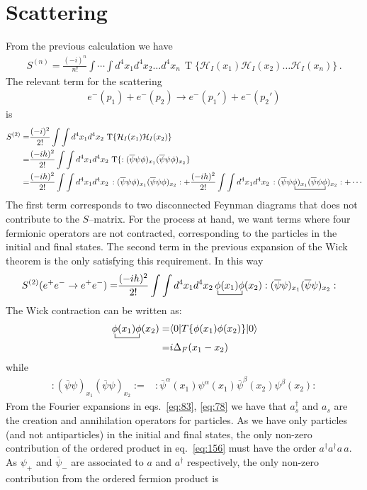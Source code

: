 \section{Scattering}
\label{sec:scattering}
From the previous calculation we have
\begin{align}
S^{(n)}=  \frac{(-i)^n}{n!}\int\cdots\int d^4x_1 d^4x_2\ldots d^4x_n\,\operatorname{T}\{\mathcal{H}_I(x_1)\mathcal{H}_I(x_2)\ldots\mathcal{H}_I(x_n)\}\,.
\end{align}
The relevant term for the scattering
\begin{align}
  e^{-}(p_1)+e^{-}(p_2)\to   e^{-}(p_1')+e^{-}(p_2')
\end{align}
is
\begin{align}
S^{(2)}=&  \frac{(-i)^2}{2!}\int\int d^4x_1 d^4x_2\,\operatorname{T}\{\mathcal{H}_I(x_1)\mathcal{H}_I(x_2)\}\nonumber\\
=&  \frac{(-ih)^2}{2!}\int\int d^4x_1 d^4x_2\,\operatorname{T}\{:(\overline{\psi}\psi\phi)_{x_1}(\overline{\psi}\psi\phi)_{x_2}\}\nonumber\\
=& 
 \frac{(-ih)^2}{2!}\int\int d^4x_1 d^4x_2\,:(\overline{\psi}\psi\phi)_{x_1}(\overline{\psi}\psi\phi
)_{x_2}:+
 \frac{(-ih)^2}{2!}\int\int d^4x_1 d^4x_2\,:(\overline{\psi}
\bcontraction{\psi}{\phi}{)_{x_1}(\overline{\psi}\psi}{\phi}
\psi\phi)_{x_1}(\overline{\psi}\psi\phi
)_{x_2}:+\cdots
\end{align}
The first term corresponds to two  disconnected Feynman diagrams that does not contribute to the $S$--matrix. For the process at hand, we want terms where four fermionic operators are not contracted, corresponding to the particles in the initial and final states. The second term in the previous expansion of the Wick theorem is the only satisfying this requirement. In this way
\begin{align}
  S^{(2)}(e^+ e^-\to e^+e^-)=&\frac{(-ih)^2}{2!}\int\int d^4x_1 d^4x_2
\bcontraction{\,}{\phi}{(x_1)}{\phi}
\,\phi(x_1)\phi(x_2):(\overline{\psi}\psi)_{x_1}(\overline{\psi}\psi)_{x_2}:
\end{align}
The Wick contraction can be written as:
\begin{align}
  \bcontraction{\,}{\phi}{(x_1)}{\phi}
\,\phi(x_1)\phi(x_2)=&\langle0|T\{\phi(x_1)\phi(x_2)\}|0\rangle\nonumber\\
=&i\Delta_F(x_1-x_2)
\end{align}
while 
\begin{align}
\label{eq:156}
  :(\overline{\psi}\psi)_{x_1}(\overline{\psi}\psi)_{x_2}:=&
:\overline{\psi}^\alpha(x_1)\psi^\alpha(x_1)\overline{\psi}^\beta(x_2)\psi^\beta(x_2):
\end{align}
From the Fourier expansions in eqs.~\eqref{eq:83}, \eqref{eq:78} we have that $a_s^\dagger$ and $a_s$ are the creation and annihilation operators for particles. As we have only particles (and not antiparticles) in the initial and final states, the only non-zero contribution of the ordered product in eq.~\eqref{eq:156} must have the order $a^\dagger a^\dagger a\, a$. As $\psi_+$ and $\overline{\psi}_-$ are associated to $a$ and $a^\dagger$ respectively, the only non-zero contribution from the ordered fermion product is

